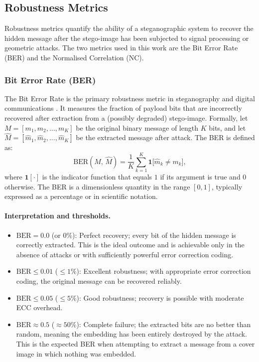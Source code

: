 \documentclass[12pt,a4paper,oneside]{report}
\begin{document}
	\subsection{Robustness Metrics}
	\label{subsec:robustness_metrics}
	
	Robustness metrics quantify the ability of a steganographic system to recover the hidden
	message after the stego-image has been subjected to signal processing or geometric attacks.
	The two metrics used in this work are the Bit Error Rate (BER) and the Normalised Correlation
	(NC).
	
	\subsubsection{Bit Error Rate (BER)}
	
	The Bit Error Rate is the primary robustness metric in steganography and digital communications
	\cite{proakis2008digital}. It measures the fraction of payload bits that are incorrectly
	recovered after extraction from a (possibly degraded) stego-image. Formally, let
	$M = [m_1, m_2, \ldots, m_K]$ be the original binary message of length $K$ bits, and let
	$\hat{M} = [\hat{m}_1, \hat{m}_2, \ldots, \hat{m}_K]$ be the extracted message after attack.
	The BER is defined as:
	\begin{equation}
		\mathrm{BER}(M,\, \hat{M}) = \frac{1}{K} \sum_{k=1}^{K} \mathbf{1}\bigl[\hat{m}_k \neq m_k\bigr],
		\label{eq:ber}
	\end{equation}
	where $\mathbf{1}[\cdot]$ is the indicator function that equals $1$ if its argument is true and
	$0$ otherwise. The BER is a dimensionless quantity in the range $[0, 1]$, typically expressed
	as a percentage or in scientific notation.
	
	\paragraph{Interpretation and thresholds.}
	\begin{itemize}
		\item $\mathrm{BER} = 0.0$ (or $0\%$): Perfect recovery; every bit of the hidden message is
		correctly extracted. This is the ideal outcome and is achievable only in the absence of
		attacks or with sufficiently powerful error correction coding.
		\item $\mathrm{BER} \leq 0.01$ ($\leq 1\%$): Excellent robustness; with appropriate error
		correction coding, the original message can be recovered reliably.
		\item $\mathrm{BER} \leq 0.05$ ($\leq 5\%$): Good robustness; recovery is possible with
		moderate ECC overhead.
		\item $\mathrm{BER} \approx 0.5$ ($\approx 50\%$): Complete failure; the extracted bits are
		no better than random, meaning the embedding has been entirely destroyed by the attack.
		This is the expected BER when attempting to extract a message from a cover image in
		which nothing was embedded.
	\end{itemize}
	
\end{document}
